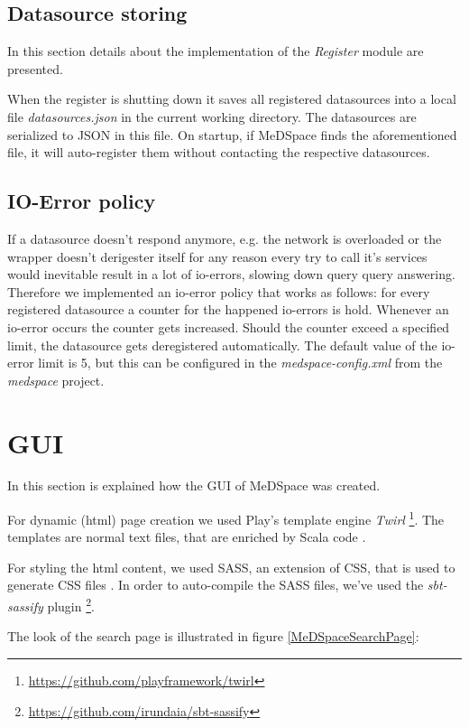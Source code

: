 \subsection{Datasource storing}
In this section details about the implementation of the \emph{Register} module are presented.

When the register is shutting down it saves all registered datasources into a local file \emph{datasources.json} in the current working directory. The datasources are serialized to JSON in this file. On startup, if MeDSpace finds the aforementioned file, it will auto-register them without contacting the respective datasources.

\subsection{IO-Error policy}

If a datasource doesn't respond anymore, e.g. the network is overloaded or the wrapper doesn't derigester itself for any reason every try to call it's services would inevitable result in a lot of io-errors, slowing down query query answering. Therefore we implemented an io-error policy that works as follows: for every registered datasource a counter for the happened io-errors is hold. Whenever an io-error occurs the counter gets increased. Should the counter exceed a specified limit, the datasource gets deregistered automatically. The default value of the io-error limit is 5, but this can be configured in the \emph{medspace-config.xml} from the \emph{medspace} project.

\section{GUI}
In this section is explained how the GUI of MeDSpace was created.

For dynamic (html) page creation we used Play's template engine \emph{Twirl} \footnote{\url{https://github.com/playframework/twirl}}. The templates are normal text files, that are enriched by Scala code \cite{PlayJavaTemplates}.

For styling the html content, we used SASS, an extension of CSS, that is used to generate CSS files \cite{SASS}. In order to auto-compile the SASS files, we've used the \emph{sbt-sassify} plugin \footnote{\url{https://github.com/irundaia/sbt-sassify}}. 

The look of the search page is illustrated in figure \ref{MeDSpaceSearchPage}:

